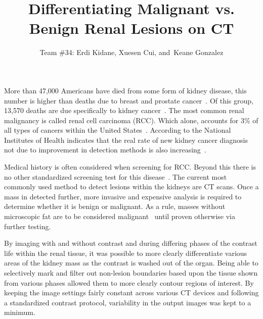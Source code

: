 \documentclass[10pt,journal,compsoc]{IEEEtran}
\begin{document}
\title{Differentiating Malignant vs. Benign Renal Lesions on CT
}  %

\author{Team \#34: Erdi Kidane,
        Xuesen Cui,
        and~Keane Gonzalez}  %

\maketitle


\IEEEPARstart
{M}{ore} than 47,000 Americans have died from some form of kidney disease, this number is higher than deaths due to breast and prostate cancer~\cite{cite1}. Of this group, 13,570 deaths are due specifically to kidney cancer~\cite{cite2}.  The most common renal malignancy is called renal cell carcinoma (RCC).  Which alone, accounts for 3\% of all types of cancers within the United States~\cite{cite3}. According to the National Institutes of Health indicates that the real rate of new kidney cancer diagnosis not due to improvement in detection methods is also increasing~\cite{cite3}.

Medical history is often considered when screening for RCC.  Beyond this there is no other standardized screening test for this disease~\cite{cite4}.  The current most commonly used method to detect lesions within the kidneys are CT scans.  Once a mass in detected further, more invasive and expensive analysis is required to determine whether it is benign or malignant.  As a rule, masses without microscopic fat are to be considered malignant~\cite{cite5} until proven otherwise via further testing. 

By imaging with and without contrast and during differing phases of the contrast life within the renal tissue, it was possible to more clearly differentiate various areas of the kidney mass as the contrast is washed out of the organ. Being able to selectively mark and filter out non-lesion boundaries based upon the tissue shown from various phases allowed them to more clearly contour regions of interest. By keeping the image settings fairly constant across various CT devices and following a standardized contrast protocol, variability in the output images was kept to a minimum. 
\end{document}
